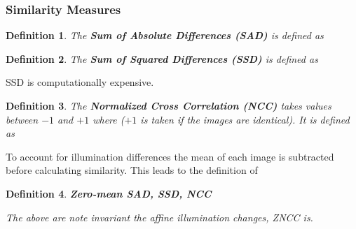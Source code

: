 \documentclass[10pt,a4paper]{scrartcl}
\newtheorem{define}{Definition}
\begin{document}
\begin{multicols*}{2}
\subsubsection{Similarity Measures}

\begin{define}
The \textbf{Sum of Absolute Differences (SAD)} is defined as

\end{define}

\begin{define}
The \textbf{Sum of Squared Differences (SSD)} is defined as

\end{define}

SSD is computationally expensive.

\begin{define}
The \textbf{Normalized Cross Correlation (NCC)} takes values between $-1$ and $+1$ where ($+1$ is taken if the images are identical). It is defined as

\end{define}

To account for illumination differences the mean of each image is subtracted before calculating similarity. This leads to the definition of

\begin{define}
\textbf{Zero-mean SAD, SSD, NCC}




The above are note invariant the affine illumination changes, ZNCC is.

\end{define}


\end{multicols*}
\end{document}

